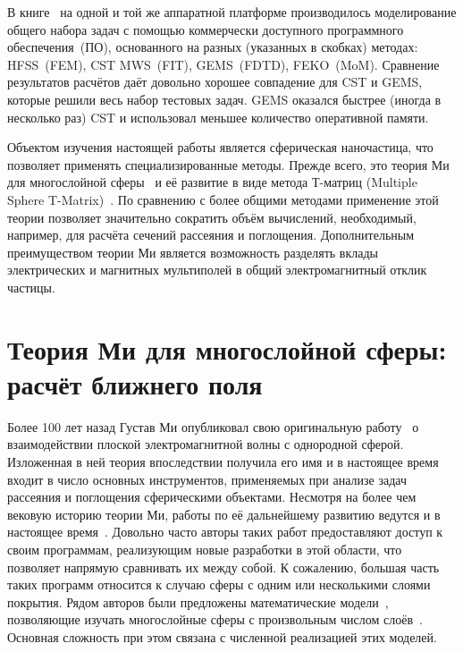 В книге~\cite{Yu-Advanced-FDTD-2011} на одной и той же аппаратной
платформе производилось моделирование общего набора задач с помощью
коммерчески доступного программного обеспечения~(ПО), основанного на разных
(указанных в скобках) методах: HFSS~(FEM), CST MWS~(FIT), GEMS~(FDTD),
FEKO~(MoM). Сравнение результатов расчётов даёт довольно хорошее
совпадение для CST и GEMS, которые решили весь
набор тестовых задач. GEMS оказался быстрее (иногда в несколько раз)
CST и использовал меньшее количество оперативной памяти.

Объектом изучения настоящей работы является сферическая наночастица,
что позволяет применять специализированные методы. Прежде
всего, это теория Ми для многослойной сферы~\cite{Yang-2003} и её
развитие в виде метода Т-матриц (Multiple Sphere
T-Matrix)~\cite{MacKowski-2012}.  По сравнению с более общими методами
применение этой теории позволяет значительно сократить объём
вычислений, необходимый, например, для расчёта сечений рассеяния и
поглощения.  Дополнительным преимуществом теории Ми является
возможность разделять вклады электрических и магнитных мультиполей в
общий электромагнитный отклик частицы.


\section{Теория Ми для многослойной сферы: расчёт ближнего поля}
\label{sec:Mie}

Более 100 лет назад Густав Ми опубликовал свою оригинальную
работу~\cite{Mie-1908} о взаимодействии плоской электромагнитной волны
с однородной сферой.  Изложенная в ней теория впоследствии получила
его имя и в настоящее время входит в число основных инструментов,
применяемых при анализе задач рассеяния и поглощения сферическими
объектами.  Несмотря на более чем вековую историю теории Ми, работы по
её дальнейшему развитию ведутся и в настоящее время~\cite{Suzuki-2008,
  MacKowski-2012, Lerme-2000, Xu-2005, Li-2006, Gogoi-2010,
  Santiago-2011}.  Довольно часто авторы таких работ предоставляют
доступ к своим программам, реализующим новые разработки в этой
области, что позволяет напрямую сравнивать их между собой.  К
сожалению, большая часть таких программ относится к случаю сферы с
одним или несколькими слоями покрытия. Рядом авторов были предложены
математические модели~\cite{Yang-2003, Pena-scattnlay-2009},
позволяющие изучать многослойные сферы с произвольным числом
слоёв~\cite{Sheehan-2013,Selmke-2012}.  Основная сложность при этом
связана с численной реализацией этих моделей.

